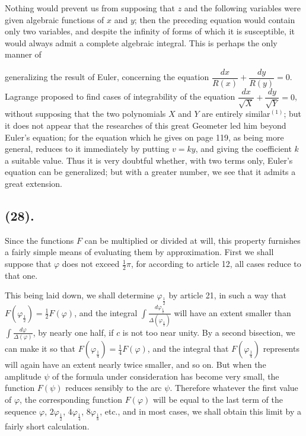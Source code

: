 \documentclass{article}
\begin{document}
Nothing would prevent us from supposing that $z$ and the following variables were given algebraic functions of $x$ and $y$; then the preceding equation would contain only two variables, and despite the infinity of forms of which it is susceptible, it would always admit a complete algebraic integral. This is perhaps the only manner of

generalizing the result of Euler, concerning the equation $\dfrac{dx}{R(x)}+\dfrac{dy}{R(y)}=0$. Lagrange proposed to find cases of integrability of the equation $\dfrac{dx}{\sqrt{X}}+\dfrac{dy}{\sqrt{Y}}=0$, without supposing that the two polynomials $X$ and $Y$ are entirely similar${}^{(1)}$; but it does not appear that the researches of this great Geometer led him beyond Euler's equation; for the equation which he gives on page 119, as being more general, reduces to it immediately by putting $v=ky$, and giving the coefficient $k$ a suitable value. Thus it is very doubtful whether, with two terms only, Euler's equation can be generalized; but with a greater number, we see that it admits a great extension.

\subsection*{(28).}

Since the functions $F$ can be multiplied or divided at will, this property furnishes a fairly simple means of evaluating them by approximation. First we shall suppose that $\varphi$ does not exceed $\frac{1}{2}\pi$, for according to article 12, all cases reduce to that one.

This being laid down, we shall determine $\varphi_{\frac{1}{2}}$ by article 21, in such a way that $F(\varphi_{\frac{1}{2}})=\frac{1}{2}F(\varphi)$, and the integral $\displaystyle\int\frac{d\varphi_{\frac{1}{2}}}{\Delta(\varphi_{\frac{1}{2}})}$ will have an extent smaller than $\displaystyle\int\frac{d\varphi}{\Delta(\varphi)}$, by nearly one half, if $c$ is not too near unity. By a second bisection, we can make it so that $F(\varphi_{\frac{1}{4}})=\frac{1}{4}F(\varphi)$, and the integral that $F(\varphi_{\frac{1}{4}})$ represents will again have an extent nearly twice smaller, and so on. But when the amplitude $\psi$ of the formula under consideration has become very small, the function $F(\psi)$ reduces sensibly to the arc $\psi$. Therefore whatever the first value of $\varphi$, the corresponding function $F(\varphi)$ will be equal to the last term of the sequence $\varphi$, $2\varphi_{\frac{1}{2}}$, $4\varphi_{\frac{1}{4}}$, $8\varphi_{\frac{1}{8}}$, etc., and in most cases, we shall obtain this limit by a fairly short calculation.
\end{document}
